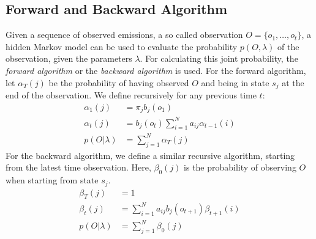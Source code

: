 \begin{minipage}{\linewidth}
	\label{fig:hmm}
	\hspace{1cm}
\end{minipage}

\subsection{Forward and Backward Algorithm}
Given a sequence of observed emissions, a so called observation $O = \{o_1, \dots, o_t\}$, a hidden Markov model can be used to evaluate the probability $p(O, \lambda)$ of the observation, given the parameters $\lambda$. For calculating this joint probability, the \textit{forward algorithm} or the \textit{backward algorithm} is used. For the forward algorithm, let $\alpha_T(j)$ be the probability of having observed $O$ and being in state $s_j$ at the end of the observation. We define recursively for any previous time $t$:
\begin{align*}
\alpha_1(j) &= \pi_j b_j(o_1) \\
\alpha_t(j) &= b_j(o_t) \sum_{i = 1}^{N} a_{ij}\alpha_{t-1}(i) \\
p(O|\lambda) &= \sum_{j = 1}^{N} \alpha_T(j)
\end{align*}
For the backward algorithm, we define a similar recursive algorithm, starting from the latest time observation. Here, $\beta_0(j)$ is the probability of observing $O$ when starting from state $s_j$.
\begin{align*}
\beta_T(j) &= 1 \\
\beta_t(j) &= \sum_{i = 1}^{N} a_{ij}b_j(o_{t+1}) \beta_{t+1}(i) \\
p(O|\lambda) &= \sum_{j = 1}^{N} \beta_0(j)
\end{align*}
